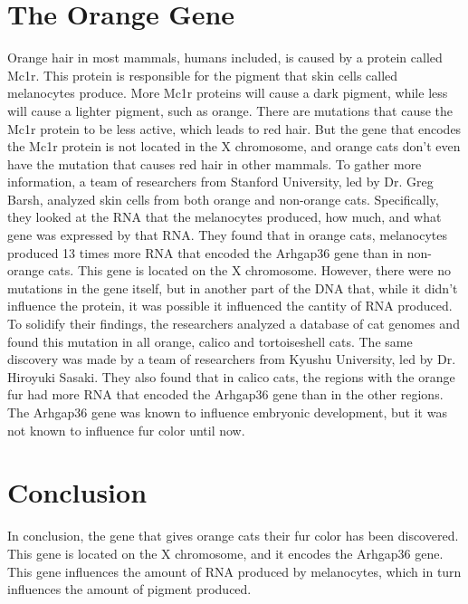 \documentclass{article}
\begin{document}
\section{The Orange Gene}
Orange hair in most mammals, humans included, is caused by a protein called Mc1r. This protein is responsible for the pigment that skin cells called melanocytes produce. More Mc1r proteins will cause a dark pigment, while less will cause a lighter pigment, such as orange. There are mutations that cause the Mc1r protein to be less active, which leads to red hair. But the gene that encodes the Mc1r protein is not located in the X chromosome, and orange cats don't even have the mutation that causes red hair in other mammals.
To gather more information, a team of researchers from Stanford University, led by Dr. Greg Barsh, analyzed skin cells from both orange and non-orange cats. Specifically, they looked at the RNA that the melanocytes produced, how much, and what gene was expressed by that RNA. They found that in orange cats, melanocytes produced 13 times more RNA that encoded the Arhgap36 gene than in non-orange cats. This gene is located on the X chromosome. However, there were no mutations in the gene itself, but in another part of the DNA that, while it didn't influence the protein, it was possible it influenced the cantity of RNA produced. To solidify their findings, the researchers analyzed a database of cat genomes and found this mutation in all orange, calico and tortoiseshell cats.
The same discovery was made by a team of researchers from Kyushu University, led by Dr. Hiroyuki Sasaki. They also found that in calico cats, the regions with the orange fur had more RNA that encoded the Arhgap36 gene than in the other regions. The Arhgap36 gene was known to influence embryonic development, but it was not known to influence fur color until now.

\section{Conclusion}
In conclusion, the gene that gives orange cats their fur color has been discovered. This gene is located on the X chromosome, and it encodes the Arhgap36 gene. This gene influences the amount of RNA produced by melanocytes, which in turn influences the amount of pigment produced.
\end{document}
